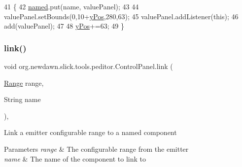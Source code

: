 \begin{DoxyCode}
41                                                                 \{
42         \mbox{\hyperlink{classorg_1_1newdawn_1_1slick_1_1tools_1_1peditor_1_1_control_panel_a27108a3c115a462302ebfa67d895bcaa}{named}}.put(name, valuePanel);
43         
44         valuePanel.setBounds(0,10+\mbox{\hyperlink{classorg_1_1newdawn_1_1slick_1_1tools_1_1peditor_1_1_control_panel_a3d5996be7856b645ae7a1288ce688623}{yPos}},280,63);
45         valuePanel.addListener(\textcolor{keyword}{this});
46         add(valuePanel);
47         
48         \mbox{\hyperlink{classorg_1_1newdawn_1_1slick_1_1tools_1_1peditor_1_1_control_panel_a3d5996be7856b645ae7a1288ce688623}{yPos}}+=63;
49     \}
\end{DoxyCode}
\mbox{\label{classorg_1_1newdawn_1_1slick_1_1tools_1_1peditor_1_1_control_panel_a0cd8f0c59ddca29c48029fcc41c0bbde}} 
\subsubsection{\texorpdfstring{link()}{link()}\hspace{0.1cm}{\footnotesize\ttfamily [1/4]}}
{\footnotesize\ttfamily void org.\+newdawn.\+slick.\+tools.\+peditor.\+Control\+Panel.\+link (\begin{DoxyParamCaption}\item[{\mbox{\hyperlink{classorg_1_1newdawn_1_1slick_1_1particles_1_1_configurable_emitter_1_1_range}{Range}}}]{range,  }\item[{String}]{name }\end{DoxyParamCaption})\hspace{0.3cm}{\ttfamily [inline]}, {\ttfamily [protected]}}

Link a emitter configurable range to a named component


\begin{DoxyParams}{Parameters}
{\em range} & The configurable range from the emitter \\
\hline
{\em name} & The name of the component to link to \\
\hline
\end{DoxyParams}

